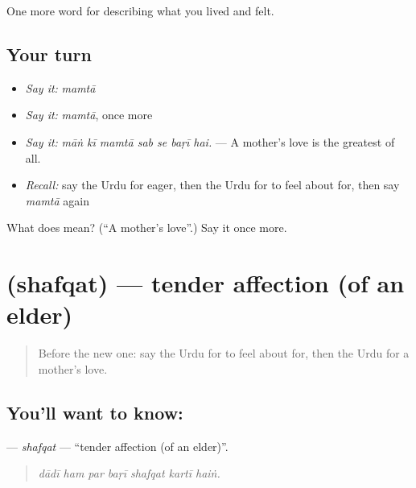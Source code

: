 \begin{grammarlens}[title={What you've built}]
One more word for describing what you lived and felt.
\end{grammarlens}

\subsection*{Your turn}
\begin{itemize}
\raggedright
  \item \emph{Say it:} \emph{mamtā}
  \item \emph{Say it:} \emph{mamtā}, once more
  \item \emph{Say it:} \emph{māṅ kī mamtā sab se baṛī hai.} — A mother's love is the greatest of all.
  \item \emph{Recall:} say the Urdu for eager, then the Urdu for to feel about for, then say \emph{mamtā} again
\end{itemize}

\begin{tcolorbox}[breakable,colback=teal!4,colframe=teal!35!black,title={Before you move on}]
What does  mean? (\textquotedblleft{}A mother's love\textquotedblright{}.) Say it once more.
\end{tcolorbox}
\section[\texorpdfstring{\ur{شفقت} (shafqat)}{شفقت (shafqat)}]{ (shafqat) — tender affection (of an elder)}

\label{lesson:UR-C449-shafqat}



\begin{quote}
Before the new one: say the Urdu for to feel about for, then the Urdu for a mother's love.
\end{quote}

\subsection*{You'll want to know: }
\textbf{} — \emph{shafqat} — \textquotedblleft{}tender affection (of an elder)\textquotedblright{}.

\begin{quote}
      
\end{quote}

\begin{quote}
\emph{dādī ham par baṛī shafqat kartī haiṅ.}
\end{quote}

